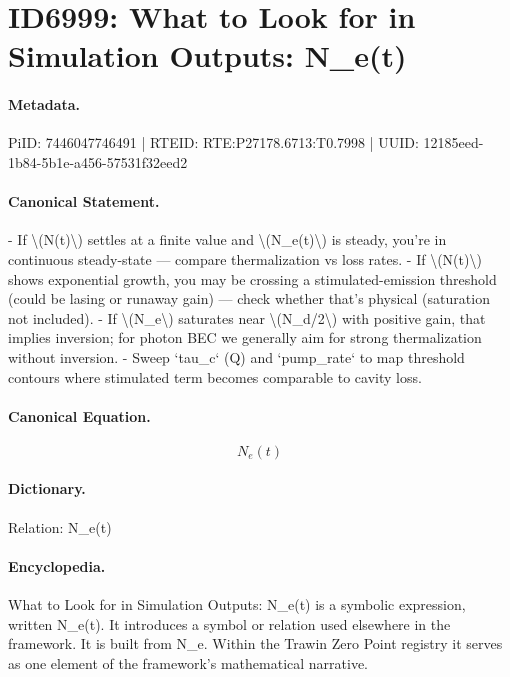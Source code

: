 \section*{ID6999: What to Look for in Simulation Outputs: N\_e(t)}
\paragraph{Metadata.}
PiID: 7446047746491 | RTEID: RTE:P27178.6713:T0.7998 | UUID: 12185eed-1b84-5b1e-a456-57531f32eed2

\paragraph{Canonical Statement.}
- If \textbackslash{}(N(t)\textbackslash{}) settles at a finite value and \textbackslash{}(N\_e(t)\textbackslash{}) is steady, you’re in continuous steady-state — compare thermalization vs loss rates. - If \textbackslash{}(N(t)\textbackslash{}) shows exponential growth, you may be crossing a stimulated-emission threshold (could be lasing or runaway gain) — check whether that’s physical (saturation not included). - If \textbackslash{}(N\_e\textbackslash{}) saturates near \textbackslash{}(N\_d/2\textbackslash{}) with positive gain, that implies inversion; for photon BEC we generally aim for strong thermalization without inversion. - Sweep `tau\_c` (Q) and `pump\_rate` to map threshold contours where stimulated term becomes comparable to cavity loss.

\paragraph{Canonical Equation.}
\[
N_e(t)
\]

\paragraph{Dictionary.}
Relation: N\_e(t)

\paragraph{Encyclopedia.}
What to Look for in Simulation Outputs: N\_e(t) is a symbolic expression, written N\_e(t). It introduces a symbol or relation used elsewhere in the framework. It is built from N\_e. Within the Trawin Zero Point registry it serves as one element of the framework's mathematical narrative.
